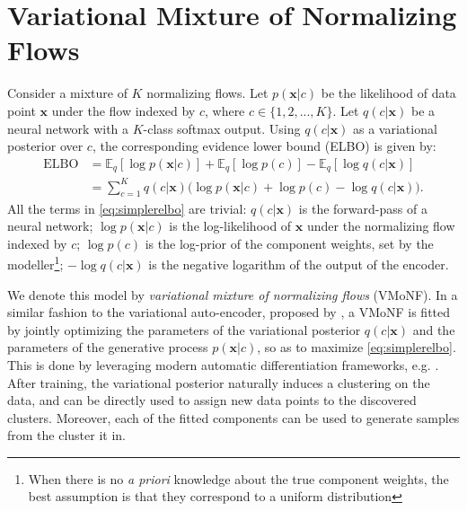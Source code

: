 \section{Variational Mixture of Normalizing Flows}
\label{section:vmonf}
Consider a mixture of $K$ normalizing flows. Let $p(\bm{x} | c)$ be the likelihood
of data point $\bm{x}$ under the flow indexed by $c$, where $c \in \{1, 2, ..., K\}$.
Let $q(c|\bm{x})$ be a neural network with a $K$-class softmax output. Using $q(c|\bm{x})$
as a variational posterior over $c$, the corresponding evidence lower bound (ELBO) is given by:
\begin{align}
    \text{ELBO} &= \mathbb{E}_q [\log p(\bm{x}|c)] + \mathbb{E}_q [\log p(c)] - \mathbb{E}_q [\log q(c|\bm{x})]
        \label{eq:threepartelbo} \\
    &= \sum_{c=1}^K q(c|\bm{x})\big(\log p(\bm{x}|c) + \log p(c) - \log q(c|\bm{x})\big). \label{eq:simplerelbo}
\end{align}
All the terms in \eqref{eq:simplerelbo} are trivial: $q(c|\bm{x})$ is the
forward-pass of a neural network; $\log p(\bm{x}|c)$ is the log-likelihood of $\bm{x}$
under the normalizing flow indexed by $c$; $\log p(c)$ is the log-prior of the
component weights, set by the modeller\footnote{When there is no \emph{a priori}
knowledge about the true component weights, the best assumption is that they
correspond to a uniform distribution}; $- \log q(c|\bm{x})$ is the negative
logarithm of the output of the encoder.

We denote this model by \emph{variational mixture of normalizing flows} (VMoNF).
In a similar fashion to the variational auto-encoder, proposed by \textcite{vaepaper},
a VMoNF is fitted by jointly optimizing the parameters of the variational
posterior $q(c|\bm{x})$ and the parameters of the generative process
$p(\bm{x}|c)$, so as to maximize \eqref{eq:simplerelbo}. This is done by leveraging
modern automatic differentiation frameworks, e.g. \autocite{pytorch}.
After training, the variational posterior naturally induces a clustering on
the data, and can be directly used to assign new data points to the discovered
clusters. Moreover, each of the fitted components can be used to generate
samples from the cluster it  in.
